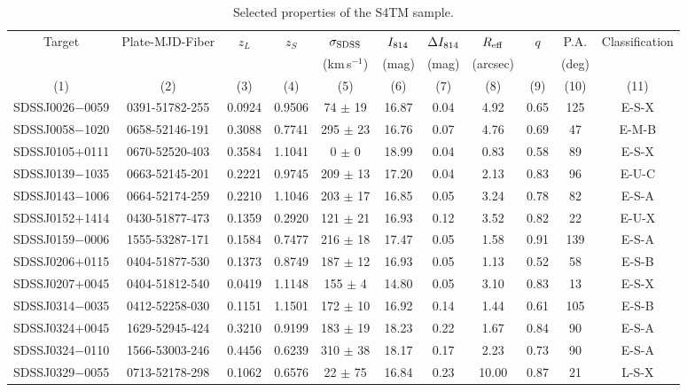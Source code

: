 \documentclass{emulateapj}
\begin{document}
\begin{table*}[htbp]
\begin{center}
\caption{\label{tb:tb1} Selected properties of the S4TM sample.}
\begin{tabular}{c c c c c c c c c c c}
\hline \hline
Target & Plate-MJD-Fiber & $z_{L}$ & $z_{S}$ & $\sigma_{\rm SDSS}$ & $I_{\rm 814}$ & $\Delta I_{\rm 814}$ & $R_{\rm eff}$ & $q$ & P.A. & Classification \\
 & & & & (km\,s$^{-1}$) & (mag) & (mag) & (arcsec) & & (deg) & \\
(1) & (2) & (3) & (4) & (5) & (6) & (7) & (8) & (9) & (10) & (11) \\
\hline
SDSSJ0026$-$0059 & 0391-51782-255 & 0.0924 & 0.9506 & 74 $\pm$   19 & 16.87 & 0.04 & 4.92 & 0.65 & 125 & E-S-X \\ 
SDSSJ0058$-$1020 & 0658-52146-191 & 0.3088 & 0.7741 & 295 $\pm$   23 & 16.76 & 0.07 & 4.76 & 0.69 & 47 & E-M-B \\ 
SDSSJ0105$+$0111 & 0670-52520-403 & 0.3584 & 1.1041 & 0 $\pm$    0 & 18.99 & 0.04 & 0.83 & 0.58 & 89 & E-S-X \\ 
SDSSJ0139$-$1035 & 0663-52145-201 & 0.2221 & 0.9745 & 209 $\pm$   13 & 17.20 & 0.04 & 2.13 & 0.83 & 96 & E-U-C \\ 
SDSSJ0143$-$1006 & 0664-52174-259 & 0.2210 & 1.1046 & 203 $\pm$   17 & 16.85 & 0.05 & 3.24 & 0.78 & 82 & E-S-A \\ 
SDSSJ0152$+$1414 & 0430-51877-473 & 0.1359 & 0.2920 & 121 $\pm$   21 & 16.93 & 0.12 & 3.52 & 0.82 & 22 & E-U-X \\ 
SDSSJ0159$-$0006 & 1555-53287-171 & 0.1584 & 0.7477 & 216 $\pm$   18 & 17.47 & 0.05 & 1.58 & 0.91 & 139 & E-S-A \\ 
SDSSJ0206$+$0115 & 0404-51877-530 & 0.1373 & 0.8749 & 187 $\pm$   12 & 16.93 & 0.05 & 1.13 & 0.52 & 58 & E-S-B \\ 
SDSSJ0207$+$0045 & 0404-51812-540 & 0.0419 & 1.1148 & 155 $\pm$    4 & 14.80 & 0.05 & 3.10 & 0.83 & 13 & E-S-X \\ 
SDSSJ0314$-$0035 & 0412-52258-030 & 0.1151 & 1.1501 & 172 $\pm$   10 & 16.92 & 0.14 & 1.44 & 0.61 & 105 & E-S-B \\ 
SDSSJ0324$+$0045 & 1629-52945-424 & 0.3210 & 0.9199 & 183 $\pm$   19 & 18.23 & 0.22 & 1.67 & 0.84 & 90 & E-S-A \\ 
SDSSJ0324$-$0110 & 1566-53003-246 & 0.4456 & 0.6239 & 310 $\pm$   38 & 18.17 & 0.17 & 2.23 & 0.73 & 90 & E-S-A \\ 
SDSSJ0329$-$0055 & 0713-52178-298 & 0.1062 & 0.6576 & 22 $\pm$   75 & 16.84 & 0.23 & 10.00 & 0.87 & 21 & L-S-X \\ 

\end{tabular}
\end{center}
\end{table*}
\end{document}
